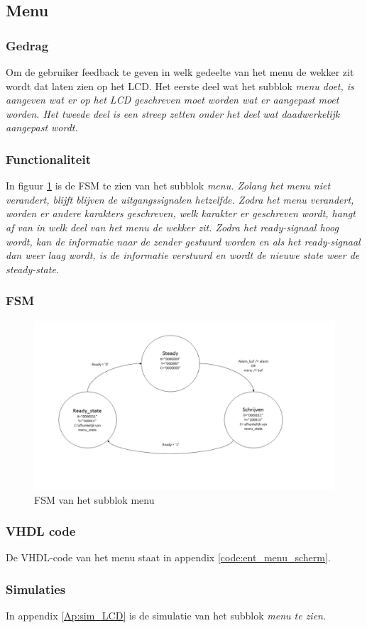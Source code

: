 \subsection{Menu}

\subsubsection{Gedrag}
Om de gebruiker feedback te geven in welk gedeelte van het menu de wekker zit wordt dat laten zien op het LCD. Het eerste deel wat het subblok \it{menu} doet, is aangeven wat er op het LCD geschreven moet worden wat er aangepast moet worden. Het tweede deel is een streep zetten onder het deel wat daadwerkelijk aangepast wordt.

\subsubsection{Functionaliteit}
In figuur \ref{fig:FSMmenu} is de FSM te zien van het subblok \it{menu}. Zolang het menu niet verandert, blijft blijven de uitgangssignalen hetzelfde. Zodra het menu verandert, worden er andere karakters geschreven, welk karakter er geschreven wordt, hangt af van in welk deel van het menu de wekker zit. Zodra het ready-signaal hoog wordt, kan de informatie naar de zender gestuurd worden en als het ready-signaal dan weer laag wordt, is de informatie verstuurd en wordt de nieuwe state weer de steady-state.

\subsubsection{FSM}

\begin{figure}[h!]
\includegraphics[width=15cm]{verslagschemas/FSMs/menu.jpg}
\caption{FSM van het subblok menu}
\label{fig:FSMmenu}
\end{figure}


\subsubsection{VHDL code}
De VHDL-code van het menu staat in appendix \ref{code:ent_menu_scherm}.

\subsubsection{Simulaties}
In appendix \ref{Ap:sim_LCD} is de simulatie van het subblok \it{menu} te zien.
